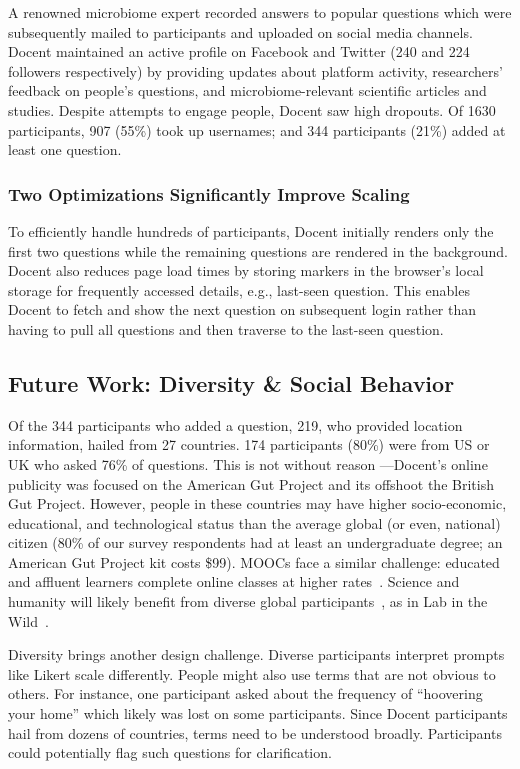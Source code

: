 A renowned microbiome expert recorded answers to popular questions which were subsequently mailed to participants and uploaded on social media channels. Docent maintained an active profile on Facebook and Twitter (240 and 224 followers respectively) by providing updates about platform activity, researchers’ feedback on people’s questions, and microbiome-relevant scientific articles and studies. Despite attempts to engage people, Docent saw high dropouts. Of 1630 participants, 907 (55\%) took up usernames; and 344 participants (21\%) added at least one question.

\subsubsection{Two Optimizations Significantly Improve Scaling}
To efficiently handle hundreds of participants, Docent initially renders only the first two questions while the remaining questions are rendered in the background. Docent also reduces page load times by storing markers in the browser’s local storage for frequently accessed details, e.g., last-seen question. This enables Docent to fetch and show the next question on subsequent login rather than having to pull all questions and then traverse to the last-seen question. 

\subsection{Future Work: Diversity \& Social Behavior}
Of the 344 participants who added a question, 219, who provided location information, hailed from 27 countries. 174 participants (80\%) were from US or UK who asked 76\% of questions. This is not without reason —Docent’s online publicity was focused on the American Gut Project and its offshoot the British Gut Project. However, people in these countries may have higher socio-economic, educational, and technological status than the average global (or even, national) citizen (80\% of our survey respondents had at least an undergraduate degree; an American Gut Project kit costs \$99). MOOCs face a similar challenge: educated and affluent learners complete online classes at higher rates~\cite{Kizilcec2017b}. Science and humanity will likely benefit from diverse global participants~\cite{Henrich2010a}, as in Lab in the Wild~\cite{Reinecke2015}.

Diversity brings another design challenge. Diverse participants interpret prompts like Likert scale differently. People might also use terms that are not obvious to others. For instance, one participant asked about the frequency of “hoovering your home” which likely was lost on some participants. Since Docent participants hail from dozens of countries, terms need to be understood broadly. Participants could potentially flag such questions for clarification. 


